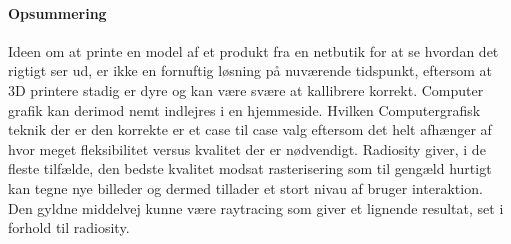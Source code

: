\paragraph{Opsummering}
Ideen om at printe en model af et produkt fra en netbutik for at se hvordan det rigtigt ser ud, er ikke en fornuftig løsning på nuværende tidspunkt, eftersom at 3D printere stadig er dyre og kan være svære at kallibrere korrekt. Computer grafik kan derimod nemt indlejres i en hjemmeside. Hvilken Computergrafisk teknik der er den korrekte er et case til case valg eftersom det helt afhænger af hvor meget fleksibilitet versus kvalitet der er nødvendigt. Radiosity giver, i de fleste tilfælde, den bedste kvalitet modsat rasterisering som til gengæld hurtigt kan tegne nye billeder og dermed tillader et stort nivau af bruger interaktion. Den gyldne middelvej kunne være raytracing som giver et lignende resultat, set i forhold til radiosity.
